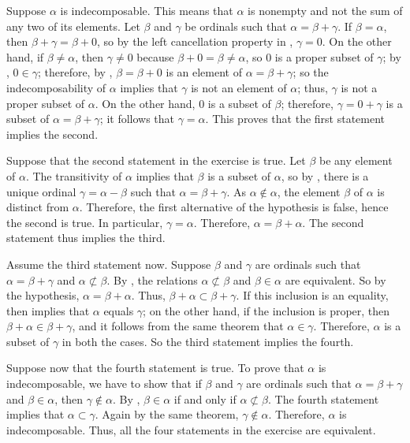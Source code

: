 \documentclass{article}
\begin{document}
\begin{solution}
  \label{sol:lodny8ys}
  Suppose \(\alpha\) is indecomposable.  This means that \(\alpha\) is
  nonempty and not the sum of any two of its elements.  Let \(\beta\)
  and \(\gamma\) be ordinals such that \(\alpha = \beta + \gamma\).
  If \(\beta = \alpha\), then \(\beta + \gamma = \beta + 0\), so by
  the left cancellation property in ,
  \(\gamma = 0\).  On the other hand, if \(\beta \neq \alpha\), then
  \(\gamma \neq 0\) because \(\beta + 0 = \beta \neq \alpha\), so
  \(0\) is a proper subset of \(\gamma\); by ,
  \(0 \in \gamma\); therefore, by ,
  \(\beta = \beta + 0\) is an element of \(\alpha = \beta + \gamma\);
  so the indecomposability of \(\alpha\) implies that \(\gamma\) is
  not an element of \(\alpha\); thus, \(\gamma\) is not a proper
  subset of \(\alpha\).  On the other hand, \(0\) is a subset of
  \(\beta\); therefore, \(\gamma = 0 + \gamma\) is a subset of
  \(\alpha = \beta + \gamma\); it follows that \(\gamma = \alpha\).
  This proves that the first statement implies the second.

  Suppose that the second statement in the exercise is true.  Let
  \(\beta\) be any element of \(\alpha\).  The transitivity of
  \(\alpha\) implies that \(\beta\) is a subset of \(\alpha\), so by
  , there is a unique ordinal
  \(\gamma = \alpha - \beta\) such that \(\alpha = \beta + \gamma\).
  As \(\alpha \notin \alpha\), the element \(\beta\) of \(\alpha\) is
  distinct from \(\alpha\).  Therefore, the first alternative of the
  hypothesis is false, hence the second is true.  In particular,
  \(\gamma = \alpha\).  Therefore, \(\alpha = \beta + \alpha\).  The
  second statement thus implies the third.

  Assume the third statement now.  Suppose \(\beta\) and \(\gamma\)
  are ordinals such that \(\alpha = \beta + \gamma\) and
  \(\alpha \nsubset \beta\).  By , the
  relations \(\alpha \nsubset \beta\) and \(\beta \in \alpha\) are
  equivalent.  So by the hypothesis, \(\alpha = \beta + \alpha\).
  Thus, \(\beta + \alpha \subset \beta + \gamma\).  If this inclusion
  is an equality, then  implies that \(\alpha\)
  equals \(\gamma\); on the other hand, if the inclusion is proper,
  then \(\beta + \alpha \in \beta + \gamma\), and it follows from the
  same theorem that \(\alpha \in \gamma\).  Therefore, \(\alpha\) is a
  subset of \(\gamma\) in both the cases.  So the third statement
  implies the fourth.

  Suppose now that the fourth statement is true.  To prove that
  \(\alpha\) is indecomposable, we have to show that if \(\beta\) and
  \(\gamma\) are ordinals such that \(\alpha = \beta + \gamma\) and
  \(\beta \in \alpha\), then \(\gamma \notin \alpha\).  By
  , \(\beta \in \alpha\) if and only
  if \(\alpha \nsubset \beta\).  The fourth statement implies that
  \(\alpha \subset \gamma\).  Again by the same theorem,
  \(\gamma \notin \alpha\).  Therefore, \(\alpha\) is indecomposable.
  Thus, all the four statements in the exercise are equivalent.
\end{solution}
\end{document}
